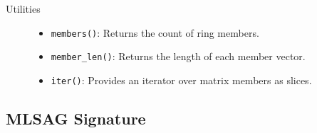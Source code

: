 \documentclass[12pt,a4paper]{article}
\begin{document}
\begin{description}
\item[Utilities] \hfill
\begin{itemize}
\item \texttt{members()}: Returns the count of ring members. %
\item \texttt{member\_len()}: Returns the length of each member vector. %
\item \texttt{iter()}: Provides an iterator over matrix members as slices. %
\end{itemize}
\end{description}

\subsection{MLSAG Signature}
\end{document}
